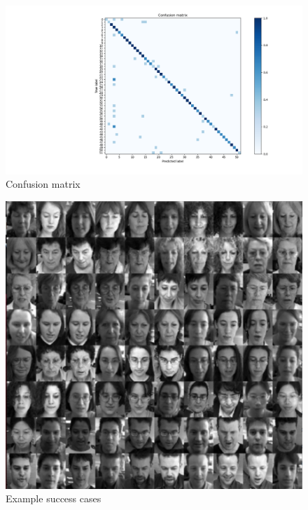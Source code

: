 \documentclass[10pt,technote]{IEEEtran}
\begin{document}
\begin{figure}[htb!]
    \centering
    \includegraphics[width = \linewidth]{../results/ex2LDA/LDA_Conf_mat2.png}
    \caption{Confusion matrix}
    \label{fig:M_LDA_conf_mat}
\end{figure}

\begin{figure}[htb!]
    \centering
    \includegraphics[width = \linewidth]{../results/ex2LDA/LDA_Example_Successes_crop.png}
    \caption{Example success cases}
    \label{fig:MLDA_success}
\end{figure}
\end{document}
